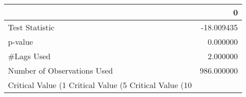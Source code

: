 \begin{tabular}{lr}
\toprule
 & 0 \\
\midrule
Test Statistic & -18.009435 \\
p-value & 0.000000 \\
#Lags Used & 2.000000 \\
Number of Observations Used & 986.000000 \\
Critical Value (1%
Critical Value (5%
Critical Value (10%
\bottomrule
\end{tabular}
